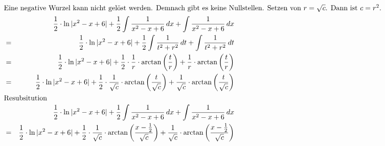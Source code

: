 \documentclass[10pt,a4paper,oneside,ngerman,numbers=noenddot]{scrartcl}
\begin{document}
\begin{alignat*}{2}
\intertext{Eine negative Wurzel kann nicht gelöst werden. Demnach gibt es keine Nullstellen. Setzen von $r = \sqrt{c}$. Dann ist $c = r^{2}$.}
&& \frac{1}{2} \cdot \ln |x^{2} - x + 6| + \frac{1}{2}\int \frac{1}{x^{2} - x + 6}\,dx + \int \frac{1}{x^{2} -x + 6}\,dx\\
&=& \frac{1}{2} \cdot \ln |x^{2} - x + 6| + \frac{1}{2}\int \frac{1}{t^{2} + r^{2}}\,dt + \int \frac{1}{t^{2} + r^{2}}\,dt \\
&=& \frac{1}{2} \cdot \ln |x^{2} - x + 6| + \frac{1}{2} \cdot \frac{1}{r} \cdot \arctan \left(\frac{t}{r} \right) + \frac{1}{r} \cdot \arctan \left(\frac{t}{r} \right) \\
&=& \frac{1}{2} \cdot \ln |x^{2} - x + 6| + \frac{1}{2} \cdot \frac{1}{\sqrt{c}} \cdot \arctan \left(\frac{t}{\sqrt{c}} \right) + \frac{1}{\sqrt{c}} \cdot \arctan \left(\frac{t}{\sqrt{c}} \right) \\
\intertext{Resubsitution}
&& \frac{1}{2} \cdot \ln |x^{2} - x + 6| + \frac{1}{2}\int \frac{1}{x^{2} - x + 6}\,dx + \int \frac{1}{x^{2} -x + 6}\,dx \\ 
&=& \frac{1}{2} \cdot \ln |x^{2} - x + 6| + \frac{1}{2} \cdot \frac{1}{\sqrt{c}} \cdot \arctan \left(\frac{x - \frac{1}{2}}{\sqrt{c}} \right) + \frac{1}{\sqrt{c}} \cdot \arctan \left(\frac{x - \frac{1}{2}}{\sqrt{c}} \right)
\end{alignat*}
\end{document}
